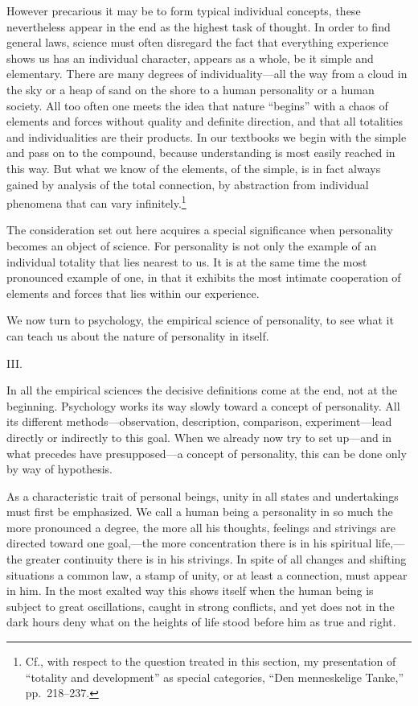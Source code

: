 \documentclass[12pt]{article}
\newcommand{\opage}[1]{\marginnote{\footnotesize\textit{[#1]}}}
\begin{document}
However precarious it may be to form typical individual concepts, these
\opage{26}%
nevertheless appear in the end as the highest task of thought. In order to find
general laws, science must often disregard the fact that everything experience
shows us has an individual character, appears as a whole, be it simple and
elementary. There are many degrees of individuality---all the way from a cloud
in the sky or a heap of sand on the shore to a human personality or a human
society. All too often one meets the idea that nature ``begins'' with a chaos of
elements and forces without quality and definite direction, and that all
totalities and individualities are their products. In our textbooks we begin
with the simple and pass on to the compound, because understanding is most
easily reached in this way. But what we know of the elements, of the simple, is
in fact always gained by analysis of the total connection, by abstraction from
individual phenomena that can vary infinitely.\footnote{Cf., with respect to
the question treated in this section, my presentation of ``totality and
development'' as special categories, ``Den menneskelige Tanke,'' pp.~218--237.}

The consideration set out here acquires a
\opage{27}%
special significance when personality becomes an object of science. For
personality is not only the example of an individual totality that lies nearest
to us. It is at the same time the most pronounced example of one, in that it
exhibits the most intimate cooperation of elements and forces that lies within
our experience.

We now turn to psychology, the empirical science of personality, to see what it
can teach us about the nature of personality in itself.

\opage{28}
\begin{center}\large III.\end{center}

In all the empirical sciences the decisive definitions come at the end, not at
the beginning. Psychology works its way slowly toward a concept of personality.
All its different methods---observation, description, comparison,
experiment---lead directly or indirectly to this goal. When we already now try to
set up---and in what precedes have presupposed---a concept of personality, this
can be done only by way of hypothesis.

As a characteristic trait of personal beings, unity in all states and
undertakings must first be emphasized. We call a human being a personality in
so much the more pronounced a degree, the more all his thoughts, feelings and
strivings are directed toward one goal,---the more concentration there is in
his spiritual life,---the greater continuity there is in his
\opage{29}%
strivings. In spite of all changes and shifting situations a common law, a
stamp of unity, or at least a connection, must appear in him. In the most
exalted way this shows itself when the human being is subject to great
oscillations, caught in strong conflicts, and yet does not in the dark hours
deny what on the heights of life stood before him as true and right.
\end{document}
